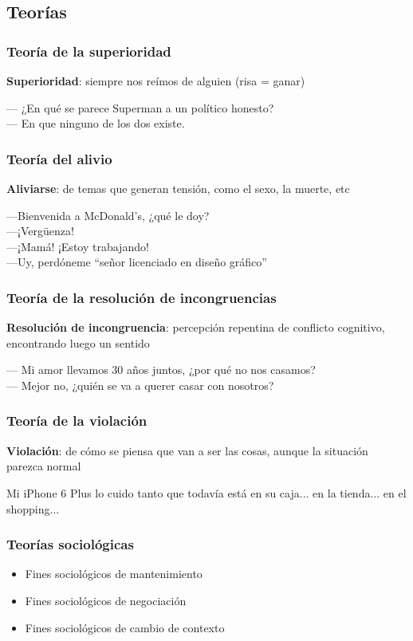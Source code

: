 \subsection{Teorías}
\begin{frame}
    \frametitle{Teoría de la superioridad}

    \textbf{Superioridad}: siempre nos reímos de alguien (risa = ganar)
    \begin{example}
        — ¿En qué se parece Superman a un político honesto? \\
        — En que ninguno de los dos existe.
    \end{example}
\end{frame}

\begin{frame}
\frametitle{Teoría del alivio}
    \textbf{Aliviarse}: de temas que generan tensión, como el sexo, la muerte, etc
    \begin{example}
        —Bienvenida a McDonald’s, ¿qué le doy?\\
        —¡Vergüenza!\\
        —¡Mamá! ¡Estoy trabajando!\\
        —Uy, perdóneme ``señor licenciado en diseño gráfico''\\
    \end{example}
\end{frame}

\begin{frame}
\frametitle{Teoría de la resolución de incongruencias}
    \textbf{Resolución de incongruencia}: percepción repentina de conflicto cognitivo, encontrando luego un sentido
    \begin{example}
        — Mi amor llevamos 30 años juntos, ¿por qué no nos casamos?\\
        — Mejor no, ¿quién se va a querer casar con nosotros?
    \end{example}
\end{frame}

\begin{frame}
\frametitle{Teoría de la violación}
    \textbf{Violación}: de cómo se piensa que van a ser las cosas, aunque la situación parezca normal
    \begin{example}
        Mi iPhone 6 Plus lo cuido tanto que todavía está en su caja... en la tienda... en el shopping...
    \end{example}
\end{frame}

\begin{frame}
\frametitle{Teorías sociológicas}
    \begin{itemize}
        \item Fines sociológicos de mantenimiento
        \item Fines sociológicos de negociación
        \item Fines sociológicos de cambio de contexto
    \end{itemize}
\end{frame}

